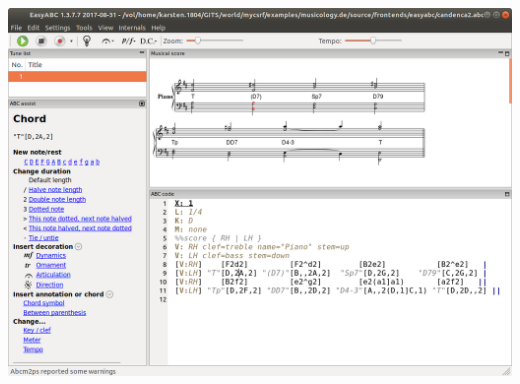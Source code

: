 \begin{center}
\includegraphics[width=1\textwidth]{frontends/easyabc/easyabc-cadenca2-300dpi.png}
\end{center}


%
